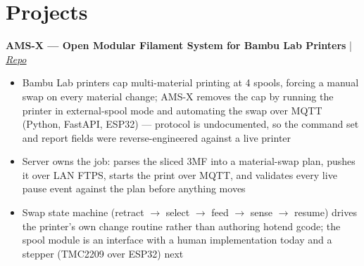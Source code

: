 \documentclass[10pt,letterpaper]{article}
\begin{document}
\section*{Projects}
\noindent\textbf{AMS-X --- Open Modular Filament System for Bambu Lab Printers} | \href{https://github.com/Amsozzer1/AMS}{\textit{Repo}}
\begin{itemize}[leftmargin=14pt]
  \item Bambu Lab printers cap multi-material printing at 4 spools, forcing a manual swap on every material change; AMS-X removes the cap by running the printer in external-spool mode and automating the swap over MQTT (Python, FastAPI, ESP32) --- protocol is undocumented, so the command set and report fields were reverse-engineered against a live printer
  \item Server owns the job: parses the sliced 3MF into a material-swap plan, pushes it over LAN FTPS, starts the print over MQTT, and validates every live pause event against the plan before anything moves
  \item Swap state machine (retract $\rightarrow$ select $\rightarrow$ feed $\rightarrow$ sense $\rightarrow$ resume) drives the printer's own change routine rather than authoring hotend gcode; the spool module is an interface with a human implementation today and a stepper (TMC2209 over ESP32) next
\end{itemize}
\end{document}
